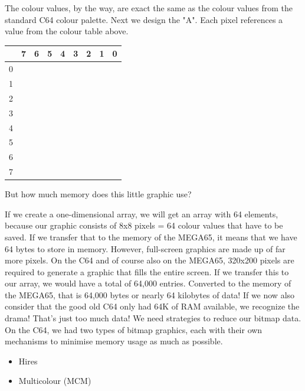The colour values, by the way, are exact the same as the colour values from the standard C64 colour palette. Next we design the "A". Each pixel references a value from the colour table above.


\begin{center}
\begin{tabular}{|m{6pt}|m{6pt}m{6pt}m{6pt}m{6pt}m{6pt}m{5pt}m{6pt}m{6pt}|}
\hline
	& 7 & 6 & 5 & 4 & 3 & 2 & 1 & 0 \\
\hline
	0 & \blkb & \blkb & \blkb & \blkb & \blkb & \blkb & \blkb & \blkb \\
	1 & \red & \lgr & \yel & \lgr & \red & \ora & \blkb & \blkb \\
	2 & \lgr & \lgr & \blkb & \blkb & \ora & \red & \blkb & \blkb \\
	3 & \yel & \yel & \blkb & \blkb & \ora & \red & \blkb & \blkb \\
	4 & \yel & \lgr & \lgr & \red & \red & \red & \blkb & \blkb \\
	5 & \lgr & \red & \blkb & \blkb & \ora & \red & \blkb & \blkb \\
	6 & \red & \red & \blkb & \blkb & \red & \red & \blkb & \blkb \\
	7 & \ora & \bwn & \blkb & \blkb & \ora & \red & \blkb & \blkb \\
\hline
\end{tabular}
\end{center}

But how much memory does this little graphic use?

If we create a one-dimensional array, we will get an array with 64 elements, because our graphic consists of 8x8 pixels = 64 colour values that have to be saved. If we transfer that to the memory of the MEGA65, it means that we have 64 bytes to store in memory. However, full-screen graphics are made up of far more pixels. On the C64 and of course also on the MEGA65, 320x200 pixels are required to generate a graphic that fills the entire screen. If we transfer this to our array, we would have a total of 64,000 entries. Converted to the memory of the MEGA65, that is 64,000 bytes or nearly 64 kilobytes of data! If we now also consider that the good old C64 only had 64K of RAM available, we recognize the drama! That's just too much data! We need strategies to reduce our bitmap data. On the C64, we had two types of bitmap graphics, each with their own mechanisms to minimise memory usage as much as possible.

\begin{itemize}
	\item Hires
	\item Multicolour (MCM)
\end{itemize}



